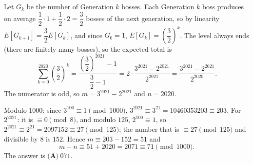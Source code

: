 Let $G_k$ be the number of Generation $k$ bosses. Each Generation $k$ boss produces on average $\dfrac{1}{2}\cdot1+\dfrac{1}{2}\cdot2=\dfrac{3}{2}$ bosses of the next generation, so by linearity $E[G_{k+1}]=\dfrac{3}{2}E[G_k]$, and since $G_0=1$, $E[G_k]=\left(\dfrac{3}{2}\right)^k$. The level always ends (there are finitely many bosses), so the expected total is
\[\sum_{k=0}^{2020}\left(\dfrac{3}{2}\right)^k=\dfrac{\left(\dfrac{3}{2}\right)^{2021}-1}{\dfrac{3}{2}-1}=2\cdot\dfrac{3^{2021}-2^{2021}}{2^{2021}}=\dfrac{3^{2021}-2^{2021}}{2^{2020}}.\]
The numerator is odd, so $m=3^{2021}-2^{2021}$ and $n=2020$.

Modulo $1000$: since $3^{100}\equiv1\pmod{1000}$, $3^{2021}\equiv3^{21}=10460353203\equiv203$. For $2^{2021}$: it is $\equiv0\pmod 8$, and modulo $125$, $2^{100}\equiv1$, so $2^{2021}\equiv2^{21}=2097152\equiv27\pmod{125}$; the number that is $\equiv27\pmod{125}$ and divisible by $8$ is $152$. Hence $m\equiv203-152=51$ and
\[m+n\equiv51+2020=2071\equiv71\pmod{1000}.\]
The answer is $\boxed{\textbf{(A)}\ 071}$.
